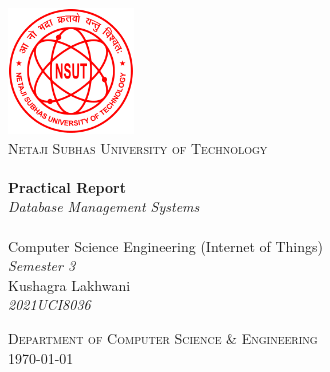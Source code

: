 \begin{titlepage}
    \begin{center}


        \includegraphics[width=0.25\textwidth]{res/NSUT.png}~\\[0.5cm]
        \textsc{\Large Netaji Subhas University of Technology}\\[2cm]


        \HRule \\[0.4cm]
        {
        \LARGE
        \textbf{Practical Report}\\[0.4cm]
        \emph{Database Management Systems}\\[0.4cm]
        }
        \HRule \\[1.5cm]


        {
        \large
        Computer Science Engineering (Internet of Things)\\[0.1cm]
        \textit{Semester 3} \\[2.7cm]
        Kushagra Lakhwani \\[0.1cm]
        \textit{2021UCI8036}\\[0.1cm]
        }

        \vfill

        \textsc{\large Department of Computer Science \& Engineering}\\[0.4cm]



        {\large \today}

    \end{center}
\end{titlepage}